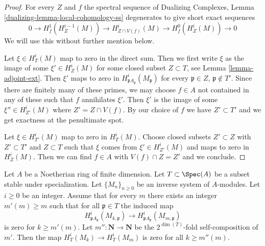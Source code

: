 \begin{proof}
For every $Z$ and $f$ the spectral sequence of
Dualizing Complexes, Lemma \ref{dualizing-lemma-local-cohomology-ss}
degenerates to give short exact sequences
$$
0 \to H^1_f(H^{i - 1}_Z(M)) \to
H^i_{Z \cap V(f)}(M) \to H^0_f(H^i_Z(M)) \to 0
$$
We will use this without further mention below.

\medskip\noindent
Let $\xi \in H^i_T(M)$ map to zero in the direct sum.
Then we first write $\xi$ as the image of some $\xi' \in H^i_Z(M)$
for some closed subset $Z \subset T$, see Lemma \ref{lemma-adjoint-ext}.
Then $\xi'$ maps to zero in $H^i_{\mathfrak p A_\mathfrak p}(M_\mathfrak p)$
for every $\mathfrak p \in Z$, $\mathfrak p \not \in T'$.
Since there are finitely many of these primes,
we may choose $f \in A$ not contained in any of these
such that $f$ annihilates $\xi'$. Then $\xi'$
is the image of some $\xi'' \in H^i_{Z'}(M)$
where $Z' = Z \cap V(f)$. By our choice of $f$ we have
$Z' \subset T'$ and we get exactness at the penultimate spot.

\medskip\noindent
Let $\xi \in H^i_{T'}(M)$ map to zero in $H^i_T(M)$.
Choose closed subsets $Z' \subset Z$ with $Z' \subset T'$
and $Z \subset T$ such that $\xi$ comes from $\xi' \in H^i_{Z'}(M)$
and maps to zero in $H^i_Z(M)$. Then we can find $f \in A$
with $V(f) \cap Z = Z'$ and we conclude.
\end{proof}

\begin{lemma}
\label{lemma-zero}
Let $A$ be a Noetherian ring of finite dimension.
Let $T \subset \Spec(A)$ be a subset stable under specialization.
Let $\{M_n\}_{n \geq 0}$ be an inverse system of $A$-modules.
Let $i \geq 0$ be an integer. Assume that for every $m$ there
exists an integer $m'(m) \geq m$ such  that for all
$\mathfrak p \in T$ the induced map
$$
H^i_{\mathfrak p A_\mathfrak p}(M_{k, \mathfrak p})
\longrightarrow
H^i_{\mathfrak p A_\mathfrak p}(M_{m, \mathfrak p})
$$
is zero for $k \geq m'(m)$. Let $m'' : \mathbf{N} \to \mathbf{N}$
be the $2^{\dim(T)}$-fold self-composition of $m'$. Then the map
$H^i_T(M_k) \to H^i_T(M_m)$ is zero for all $k \geq m''(m)$.
\end{lemma}

